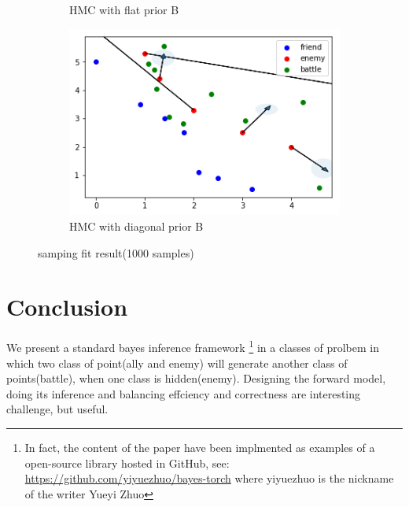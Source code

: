 \documentclass{article}
\begin{document}
\begin{figure}[h!]
\begin{subfigure}[b]{0.45\linewidth}
    \caption{HMC with flat prior B}
  \end{subfigure}
  \begin{subfigure}[b]{0.45\linewidth}
    \includegraphics[width=\linewidth]{Sampling42.png}
    \caption{HMC with diagonal prior B}
  \end{subfigure}
  \caption{samping fit result(1000 samples)}
  \label{fig:SamplingTen}
\end{figure}


\section{Conclusion}

We present a standard bayes inference framework 
\footnote{In fact, the content of the paper have been implmented as examples of a open-source library
hosted in GitHub, see: \url{https://github.com/yiyuezhuo/bayes-torch} where yiyuezhuo is the nickname of
the writer Yueyi Zhuo} 
in a classes of prolbem in which 
two class of point(ally and enemy) will generate another class of points(battle), 
when one class is hidden(enemy).
Designing the forward model, doing its inference and balancing effciency and correctness 
are interesting challenge, but useful.

 

\end{document}
